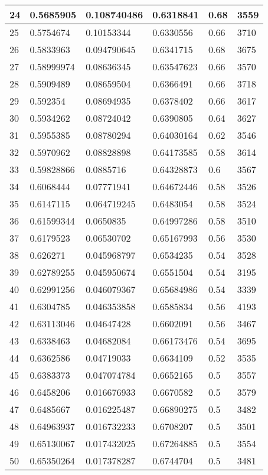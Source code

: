\begin{longtable}{|l|l|l|l|l|l|}
24 & 0.5685905 & 0.108740486 & 0.6318841 & 0.68 & 3559 \\ \hline 
25 & 0.5754674 & 0.10153344 & 0.6330556 & 0.66 & 3710 \\ \hline 
26 & 0.5833963 & 0.094790645 & 0.6341715 & 0.68 & 3675 \\ \hline 
27 & 0.58999974 & 0.08636345 & 0.63547623 & 0.66 & 3570 \\ \hline 
28 & 0.5909489 & 0.08659504 & 0.6366491 & 0.66 & 3718 \\ \hline 
29 & 0.592354 & 0.08694935 & 0.6378402 & 0.66 & 3617 \\ \hline 
30 & 0.5934262 & 0.08724042 & 0.6390805 & 0.64 & 3627 \\ \hline 
31 & 0.5955385 & 0.08780294 & 0.64030164 & 0.62 & 3546 \\ \hline 
32 & 0.5970962 & 0.08828898 & 0.64173585 & 0.58 & 3614 \\ \hline 
33 & 0.59828866 & 0.0885716 & 0.64328873 & 0.6 & 3567 \\ \hline 
34 & 0.6068444 & 0.07771941 & 0.64672446 & 0.58 & 3526 \\ \hline 
35 & 0.6147115 & 0.064719245 & 0.6483054 & 0.58 & 3524 \\ \hline 
36 & 0.61599344 & 0.0650835 & 0.64997286 & 0.58 & 3510 \\ \hline 
37 & 0.6179523 & 0.06530702 & 0.65167993 & 0.56 & 3530 \\ \hline 
38 & 0.626271 & 0.045968797 & 0.6534235 & 0.54 & 3528 \\ \hline 
39 & 0.62789255 & 0.045950674 & 0.6551504 & 0.54 & 3195 \\ \hline 
40 & 0.62991256 & 0.046079367 & 0.65684986 & 0.54 & 3339 \\ \hline 
41 & 0.6304785 & 0.046353858 & 0.6585834 & 0.56 & 4193 \\ \hline 
42 & 0.63113046 & 0.04647428 & 0.6602091 & 0.56 & 3467 \\ \hline 
43 & 0.6338463 & 0.04682084 & 0.66173476 & 0.54 & 3695 \\ \hline 
44 & 0.6362586 & 0.04719033 & 0.6634109 & 0.52 & 3535 \\ \hline 
45 & 0.6383373 & 0.047074784 & 0.6652165 & 0.5 & 3557 \\ \hline 
46 & 0.6458206 & 0.016676933 & 0.6670582 & 0.5 & 3579 \\ \hline 
47 & 0.6485667 & 0.016225487 & 0.66890275 & 0.5 & 3482 \\ \hline 
48 & 0.64963937 & 0.016732233 & 0.6708207 & 0.5 & 3501 \\ \hline 
49 & 0.65130067 & 0.017432025 & 0.67264885 & 0.5 & 3554 \\ \hline 
50 & 0.65350264 & 0.017378287 & 0.6744704 & 0.5 & 3481 \\ \hline 
\end{longtable}